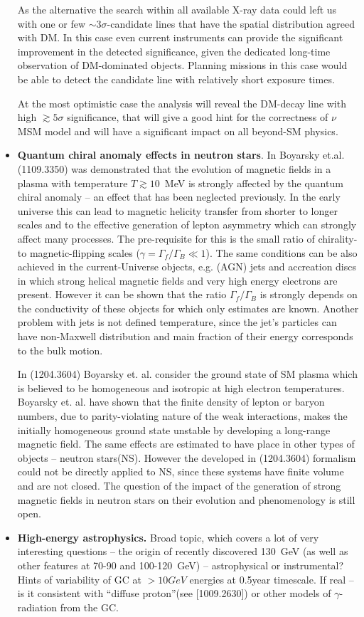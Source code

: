 \documentclass{article} \oddsidemargin -0,05 cm \textwidth
\begin{document}
\begin{itemize}
    As the alternative the search within all available X-ray data could left us with one or few $\sim3\sigma$-candidate lines that have the spatial distribution agreed with DM. In this case even current instruments can provide the significant improvement in the detected significance, given the dedicated long-time observation of DM-dominated objects. Planning missions in this case would be able to detect the candidate line with relatively short exposure times.

    At the most optimistic case the analysis will reveal the DM-decay line with high $\gtrsim 5\sigma$ significance, that will give a good hint for the correctness of $\nu$MSM model and will have a significant impact on all beyond-SM physics.

\item \textbf{Quantum chiral anomaly effects in neutron stars}. In Boyarsky et.al.(1109.3350) was demonstrated that the evolution of magnetic fields in a plasma with temperature $T\gtrsim 10$~MeV is strongly affected by the quantum chiral anomaly -- an effect that has been neglected previously. In the early universe this can lead to magnetic helicity transfer from shorter to
longer scales and to the effective generation of lepton asymmetry which can strongly affect many processes. The pre-requisite for this is the small ratio of chirality- to magnetic-flipping scales ($\gamma=\Gamma_f/\Gamma_B \ll 1$). The same conditions can be also achieved in the current-Universe objects, e.g. (AGN) jets and accreation discs in which strong helical magnetic fields and very high energy electrons are present. However it can be shown that the ratio $\Gamma_f/\Gamma_B$ is strongly depends on the conductivity of these objects for which only estimates are known. Another problem with jets is not defined temperature, since the jet's particles can have non-Maxwell distribution and main fraction of their energy corresponds to the bulk motion.

In (1204.3604) Boyarsky et. al. consider the ground state of SM plasma which is believed to be homogeneous and isotropic at high electron
 temperatures. Boyarsky et. al. have shown that the finite density of lepton or baryon numbers, due to parity-violating nature of the weak
  interactions, makes the initially homogeneous ground state unstable by developing a long-range magnetic field.
  The same effects are estimated to have place in other types of objects -- neutron stars(NS). However the developed in (1204.3604) formalism could not be
   directly applied to NS, since these systems have finite volume and are not closed. The question of the impact of the generation of strong magnetic fields
    in neutron stars on their evolution and phenomenology is still open.

\item \textbf{High-energy astrophysics.} Broad topic, which covers a lot of very interesting questions -- the origin of recently discovered 130~GeV (as well as other features at 70-90 and 100-120~GeV) -- astrophysical or instrumental? Hints of variability of GC at $>10GeV$ energies at 0.5year timescale. If real -- is it consistent with ``diffuse proton''(see [1009.2630]) or other models of $\gamma$-radiation from the GC.
\end{itemize}
\end{document}
